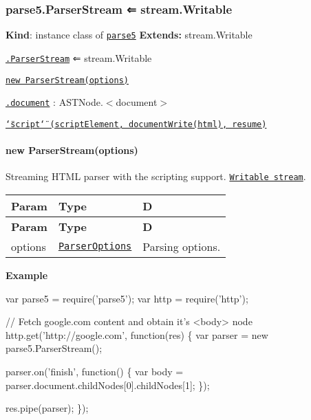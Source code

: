 \label{_parse5+ParserStream}%
 \subsubsection*{parse5.\+Parser\+Stream ⇐ {\ttfamily stream.\+Writable}}

{\bfseries Kind}\+: instance class of {\ttfamily \href{#parse5}{\tt parse5}} {\bfseries Extends\+:} {\ttfamily stream.\+Writable}


\begin{DoxyItemize}
\item \href{#parse5+ParserStream}{\tt .Parser\+Stream} ⇐ {\ttfamily stream.\+Writable}
\begin{DoxyItemize}
\item \href{#new_parse5+ParserStream_new}{\tt new Parser\+Stream(options)}
\item \href{#parse5+ParserStream+document}{\tt .document} \+: {\ttfamily A\+S\+T\+Node.$<$document$>$}
\item \href{#parse5+ParserStream+event_script}{\tt \char`\"{}script\char`\"{} (script\+Element, document\+Write(html), resume)}
\end{DoxyItemize}
\end{DoxyItemize}

\label{_new_parse5+ParserStream_new}%
 \paragraph*{new Parser\+Stream(options)}

Streaming H\+T\+ML parser with the scripting support. \href{https://nodejs.org/api/stream.html#stream_class_stream_writable}{\tt Writable stream}.

\tabulinesep=1mm
\begin{longtabu} spread 0pt [c]{*{3}{|X[-1]}|}
\hline
\rowcolor{\tableheadbgcolor}\textbf{ Param  }&\textbf{ Type  }&\textbf{ D   }\\
\endfirsthead
\hline
\endfoot
\hline
\rowcolor{\tableheadbgcolor}\textbf{ Param  }&\textbf{ Type  }&\textbf{ D   }\\
\endhead
options  &{\ttfamily \href{#ParserOptions}{\tt Parser\+Options}}  &Parsing options.   \\
\end{longtabu}


{\bfseries Example} 
\begin{DoxyCode}
var parse5 = require('parse5');
var http = require('http');

// Fetch google.com content and obtain it's <body> node
http.get('http://google.com', function(res) \{
 var parser = new parse5.ParserStream();

 parser.on('finish', function() \{
     var body = parser.document.childNodes[0].childNodes[1];
 \});

 res.pipe(parser);
\});
\end{DoxyCode}
 \label{_parse5+ParserStream+document}%
